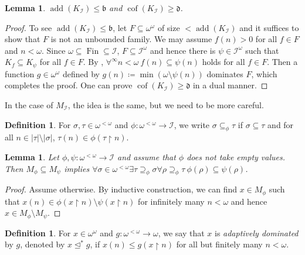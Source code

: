 \documentclass[a4paper,12pt]{amsart}
\newtheorem{lem}[thm]{Lemma}
\theoremstyle{definition}
\newtheorem{dfn}[thm]{Definition}
\numberwithin{thm}{section}
\numberwithin{equation}{section}
\newcommand{\oo}{{\omega}^\omega}
\newcommand{\fsq}{\omega^{<\omega}}
\newcommand{\on}{\mathpunct{\upharpoonright}}
\newcommand{\bb}{\mathfrak{b}}
\newcommand{\dd}{\mathfrak{d}}
\DeclareMathOperator{\add}{add}
\DeclareMathOperator{\cof}{cof}
\newcommand{\I}{\mathscr{I}}
\DeclareMathOperator{\Fin}{Fin}
\newcommand{\sbd}{\trianglelefteq^*}
\renewcommand{\subset}{\subseteq}
\begin{document}
    \begin{lem}\label{lem:addK_I_leq_b}
        $\add(K_\I)\leq\bb$ and $\cof(K_\I)\geq\dd$.
    \end{lem}
    \begin{proof}
        To see $\add(K_\I)\leq\bb$, let $F\subset\omega^\omega$ of size $<\add(K_\I)$ and it suffices to show that $F$ is not an unbounded family. We may assume $f(n)>0$ for all $f\in F$ and $n<\omega$. Since $\omega\subseteq\Fin\subseteq\I$, $F\subseteq\I^\omega$ and hence there is $\psi\in\I^\omega$ such that $K_f\subseteq K_\psi$ for all $f\in F$. By , $\forall^\infty n<\omega~f(n)\subset\psi(n)$ holds for all $f\in F$. Then a function $g\in\omega^\omega$ defined by $g(n)\coloneqq\min(\omega\setminus\psi(n))$ dominates $F$, which completes the proof. One can prove $\cof(K_\I)\geq\dd$ in a dual manner.
    \end{proof}

    In the case of $M_\I$, the idea is the same, but we need to be more careful.

    \begin{dfn}
        For $\sigma,\tau\in\fsq$ and $\phi\colon\fsq\to\I$, we write $\sigma\subseteq_\phi\tau$ if $\sigma\subseteq\tau$ and for all $n\in|\tau|\setminus|\sigma|$, $\tau(n)\in\phi(\tau\on n)$.
    \end{dfn}
    
    \begin{lem}\label{lem:M_phi_psi}
        Let $\phi,\psi\colon\fsq\to\I$ and assume that $\phi$ does not take empty values. Then $M_\phi\subseteq M_\psi$ implies $\forall\sigma\in\fsq \exists\tau\supseteq_\phi\sigma\forall\rho\supseteq_\phi\tau~\phi(\rho)\subseteq\psi(\rho)$.
    \end{lem}
    \begin{proof}
        Assume otherwise. By inductive construction, we can find $x\in M_\phi$ such that $x(n)\in \phi(x\on n)\setminus \psi(x\on n)$ for infinitely many $n<\omega$ and hence $x\in M_\phi\setminus M_\psi$.
    \end{proof}

    \begin{dfn}
	   For $x\in\oo$ and $g\colon \fsq\to\omega$, we say that $x$ is \emph{adaptively dominated} by $g$, denoted by $x\sbd g$, if $x(n)\leq g(x\on n)$ for all but finitely many $n<\omega$.
    \end{dfn}
\end{document}
